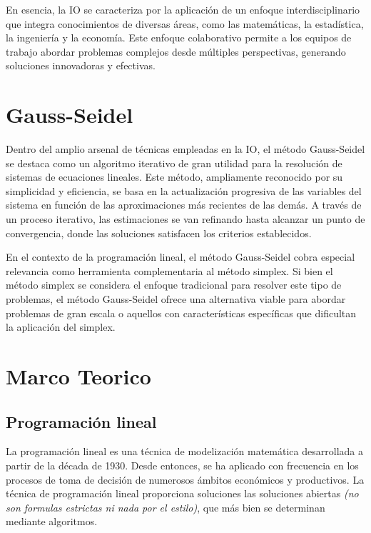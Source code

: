\documentclass[conference]{IEEEtran}
\begin{document}
En esencia, la IO se caracteriza por la aplicación de un enfoque
interdisciplinario que integra conocimientos de diversas áreas, como
las matemáticas, la estadística, la ingeniería y la economía. Este
enfoque colaborativo permite a los equipos de trabajo abordar problemas
complejos desde múltiples perspectivas, generando soluciones innovadoras
y efectivas.

\section{Gauss-Seidel}

Dentro del amplio arsenal de técnicas empleadas en la IO, el método
Gauss-Seidel se destaca como un algoritmo iterativo de gran utilidad para
la resolución de sistemas de ecuaciones lineales. Este método, ampliamente
reconocido por su simplicidad y eficiencia, se basa en la actualización
progresiva de las variables del sistema en función de las aproximaciones
más recientes de las demás. A través de un proceso iterativo, las
estimaciones se van refinando hasta alcanzar un punto de convergencia, donde
las soluciones satisfacen los criterios establecidos.

En el contexto de la programación lineal, el método Gauss-Seidel cobra
especial relevancia como herramienta complementaria al método simplex. Si
bien el método simplex se considera el enfoque tradicional para resolver
este tipo de problemas, el método Gauss-Seidel ofrece una alternativa viable
para abordar problemas de gran escala o aquellos con características
específicas que dificultan la aplicación del simplex.

\section{Marco Teorico}

\subsection{Programación lineal}

La programación lineal es una técnica de modelización matemática desarrollada
a partir de la década de 1930. Desde entonces, se ha aplicado con
frecuencia en los procesos de toma de decisión de numerosos ámbitos
económicos y productivos. La técnica de programación lineal proporciona
soluciones las soluciones abiertas \textit{(no son formulas estrictas ni
    nada por el estilo)}, que más bien se determinan mediante algoritmos.
\end{document}
